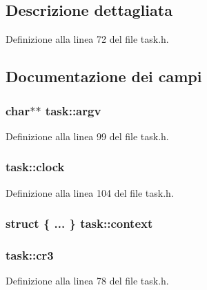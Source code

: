 \subsection{Descrizione dettagliata}


Definizione alla linea 72 del file task.\+h.



\subsection{Documentazione dei campi}
\hypertarget{structtask_a91e7540d20695c7439f7d0755a7a0545}{
\subsubsection[{argv}]{\setlength{\rightskip}{0pt plus 5cm}char$\ast$$\ast$ task\+::argv}}\label{structtask_a91e7540d20695c7439f7d0755a7a0545}


Definizione alla linea 99 del file task.\+h.

\hypertarget{structtask_a8a31c6648c1b1869bfa069f4a969b0ad}{
\subsubsection[{clock}]{ task\+::clock}}\label{structtask_a8a31c6648c1b1869bfa069f4a969b0ad}


Definizione alla linea 104 del file task.\+h.

\hypertarget{structtask_a7e47fc3627188eeefc77f78e8d36ddd1}{
\subsubsection[{context}]{\setlength{\rightskip}{0pt plus 5cm}struct \{ ... \}   task\+::context}}\label{structtask_a7e47fc3627188eeefc77f78e8d36ddd1}
\hypertarget{structtask_a5f4968459d4640f19c7e802ae7057179}{
\subsubsection[{cr3}]{ task\+::cr3}}\label{structtask_a5f4968459d4640f19c7e802ae7057179}


Definizione alla linea 78 del file task.\+h.

